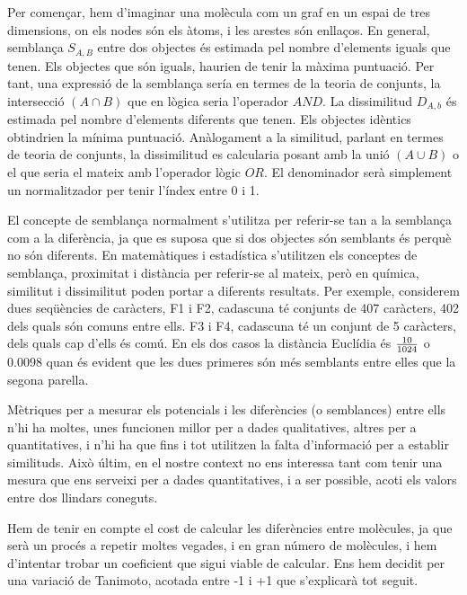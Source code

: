 \documentclass[titlepage,a4paper,12pt]{book}
\begin{document}

Per començar, hem d'imaginar una molècula com un graf en un espai de tres
dimensions, on els nodes són els àtoms, i les arestes són enllaços.  En general,
semblança $S_{A,B}$ entre dos objectes és estimada pel nombre d'elements iguals
que tenen. Els objectes que són iguals, haurien de tenir la màxima puntuació.
Per tant, una expressió de la semblança sería en termes de la teoria de
conjunts, la intersecció $(A\cap B)$ que en lògica seria l'operador $AND$. La
dissimilitud $D_{A,b}$ és estimada pel nombre d'elements diferents que tenen.
Els objectes idèntics obtindrien la mínima puntuació. Anàlogament a la
similitud, parlant en termes de teoria de conjunts, la dissimilitud es
calcularia posant amb la unió $(A\cup B)$ o el que seria el mateix amb
l'operador lògic $OR$. El denominador serà simplement un normalitzador per tenir
l'índex entre 0 i 1. 

El concepte de semblança normalment s'utilitza per referir-se tan a la semblança
com a la diferència, ja que es suposa que si dos objectes són semblants és
perquè no són diferents. En matemàtiques i estadística s'utilitzen els conceptes
de semblança, proximitat i distància per referir-se al mateix, però en química,
similitut i dissimilitut poden portar a diferents resultats. Per exemple,
considerem dues seqüències de caràcters, F1 i F2, cadascuna té conjunts de 407
caràcters, 402 dels quals són comuns entre ells. F3 i F4, cadascuna té un
conjunt de 5 caràcters, dels quals cap d'ells és comú. En els dos casos la
distància Euclídia és $10 \over 1024$  o $0.0098$ quan és evident que les dues
primeres són més semblants entre elles que la segona parella.


Mètriques per a mesurar els potencials i les diferències (o semblances) entre
ells n'hi ha moltes, unes funcionen millor per a dades qualitatives, altres per
a quantitatives, i n'hi ha que fins i tot utilitzen la falta d'informació per a
establir similituds.  Això últim, en el nostre context no ens interessa tant com
tenir una mesura que ens serveixi per a dades quantitatives, i a ser possible,
acoti els valors entre dos llindars coneguts.

Hem de tenir en compte el cost de calcular les diferències entre molècules, ja
que serà un procés a repetir moltes vegades, i en gran número de molècules, i
hem d'intentar trobar un coeficient que sigui viable de calcular.  Ens hem
decidit per una variació de Tanimoto, acotada entre -1 i +1 que s'explicarà tot
seguit.
\end{document}
